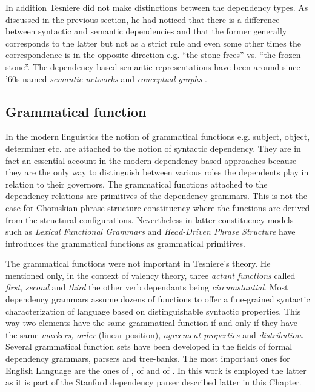 In addition Tesniere did not make distinctions between the dependency types. As discussed in the previous section, he had noticed that there is a difference between syntactic and semantic dependencies and that the former generally corresponds to the latter but not as a strict rule and even some other times the correspondence is in the opposite direction e.g. ``the stone frees'' vs. ``the frozen stone''. The dependency based semantic representations have been around since '60s named \textit{semantic networks} \citep{ZolkovskijMelcuk67,melcuk88} and \textit{conceptual graphs} \citep{schank1969, Sowa1976}.

\subsection{Grammatical function} 
In the modern linguistics the notion of grammatical functions e.g. subject, object, determiner etc. are attached to the notion of syntactic dependency. They are in fact an essential account in the modern dependency-based approaches because they are the only way to distinguish between various roles the dependents play in relation to their governors. The grammatical functions attached to the dependency relations are primitives of the dependency grammars. This is not the case for Chomskian phrase structure constituency where the functions are derived from the structural configurations. Nevertheless in latter constituency models such as \textit{Lexical Functional Grammars} \citep{Brensan2000} and \textit{Head-Driven Phrase Structure} \citep{PollardSag1994} have introduces the grammatical functions as grammatical primitives.

The grammatical functions were not important in Tesniere's theory. He mentioned only, in the context of valency theory, three \textit{actant functions} called \textit{first}, \textit{second} and \textit{third} the other verb dependants being \textit{circumstantial}. Most dependency grammars assume dozens of functions to offer a fine-grained syntactic characterization of language based on distinguishable syntactic properties. This way two elements have the same grammatical function if and only if they have the same \textit{markers,} \textit{order} (linear position), \textit{agreement properties} and \textit{distribution}. Several grammatical function sets have been developed in the fields of formal dependency grammars, parsers and tree-banks. The most important ones for English Language are the ones of \citet{MelcukPertsov86}, of \citet{Johnson2000} and of \citet{Marneffe2008, Marneffe2008a}. In this work is employed the latter as it is part of the Stanford dependency parser described latter in this Chapter. 

